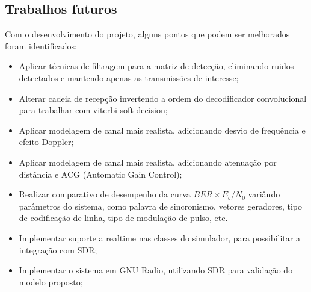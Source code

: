 \subsection{Trabalhos futuros}

Com o desenvolvimento do projeto, alguns pontos que podem ser melhorados foram identificados: 
\begin{itemize}
    \item Aplicar técnicas de filtragem para a matriz de detecção, eliminando ruidos detectados e mantendo apenas as transmissões de interesse; 
    \item Alterar cadeia de recepção invertendo a ordem do decodificador convolucional para trabalhar com viterbi soft-decision;
    \item Aplicar modelagem de canal mais realista, adicionando desvio de frequência e efeito Doppler;
    \item Aplicar modelagem de canal mais realista, adicionando atenuação por distância e ACG (Automatic Gain Control);
    \item Realizar comparativo de desempenho da curva $BER \times E_b/N_0$ variândo parâmetros do sistema, como palavra de sincronismo, vetores geradores, tipo de codificação de linha, tipo de modulação de pulso, etc.
    \item Implementar suporte a realtime nas classes do simulador, para possibilitar a integração com \gls{SDR};
    \item Implementar o sistema em GNU Radio, utilizando \gls{SDR} para validação do modelo proposto;
\end{itemize}